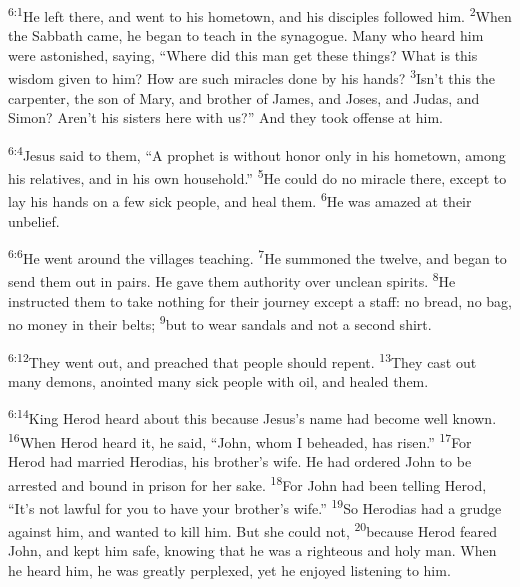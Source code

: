 \documentclass[openany,12pt,english]{book}
\newenvironment{para}{\par\pretolerance=100\tolerance=200\setlength{\emergencystretch}{0.6em}\relax}{\par}
\begin{document}
\bigskip{}

\begin{para}
    \textsuperscript{6:1}\thinspace{}He left there, and went to his home\-town, and his disciples followed him.
    \textsuperscript{2}\thinspace{}When the Sabbath came, he be\-gan to teach in the syn\-a\-gogue. Man\-y who heard him were astonished, say\-ing, “Where did this man get these things? What is this wis\-dom giv\-en to him? How are such miracles done by his hands?
    \textsuperscript{3}\thinspace{}Is\-n't this the car\-pen\-ter, the son of Mar\-y, and broth\-er of James, and Joses, and Ju\-das, and Simon? Aren't his sisters here with us?” And they took of\-fense at him.
\end{para}

\begin{para}
    \textsuperscript{6:4}\thinspace{}Jesus said to them, “A proph\-et is with\-out hon\-or on\-ly in his home\-town, a\-mong his relatives, and in his own house\-hold.”
    \textsuperscript{5}\thinspace{}He could do no mir\-a\-cle there, ex\-cept to lay his hands on a few sick peo\-ple, and heal them.
    \textsuperscript{6}\thinspace{}He was a\-mazed at their un\-be\-lief.
\end{para}

\bigskip{}

\begin{para}
    \textsuperscript{6:6}\thinspace{}He went a\-round the villages teach\-ing.
    \textsuperscript{7}\thinspace{}He summoned the twelve, and be\-gan to send them out in pairs. He gave them au\-thor\-i\-ty over un\-clean spirits.
    \textsuperscript{8}\thinspace{}He instructed them to take noth\-ing for their jour\-ney ex\-cept a staff: no bread, no bag, no mon\-ey in their belts;
    \textsuperscript{9}\thinspace{}but to wear sandals and not a second shirt.
\end{para}

\begin{para}
    \textsuperscript{6:12}\thinspace{}They went out, and preached that peo\-ple should re\-pent.
    \textsuperscript{13}\thinspace{}They cast out man\-y demons, anointed man\-y sick peo\-ple with oil, and healed them.
\end{para}

\bigskip{}

\begin{para}
    \textsuperscript{6:14}\thinspace{}King Her\-od heard a\-bout this be\-cause Jesus's name had be\-come well known.
    \textsuperscript{16}\thinspace{}When Her\-od heard it, he said, “John, whom I beheaded, has ris\-en.”
    \textsuperscript{17}\thinspace{}For Her\-od had mar\-ried Herodias, his brother's wife. He had ordered John to be arrested and bound in pris\-on for her sa\-ke.
    \textsuperscript{18}\thinspace{}For John had been tell\-ing Her\-od, “It's not law\-ful for you to have your brother's wife.”
    \textsuperscript{19}\thinspace{}So Herodias had a grudge against him, and wanted to kill him. But she could not,
    \textsuperscript{20}\thinspace{}be\-cause Her\-od feared John, and kept him safe, know\-ing that he was a right\-eous and ho\-ly man. When he heard him, he was great\-ly per\-plexed, yet he enjoyed listening to him.
\end{para}
\end{document}

